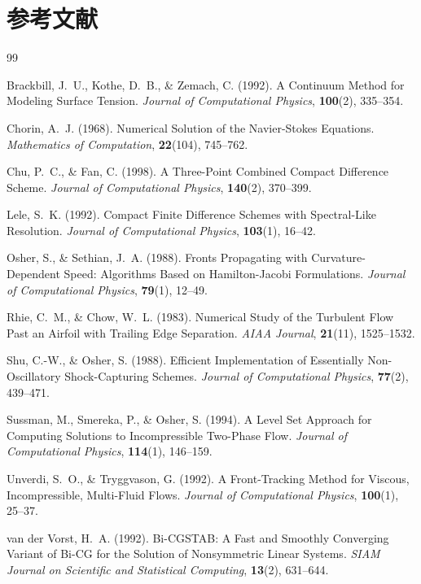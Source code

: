 \documentclass[12pt, a4paper, titlepage]{article}
\newcommand{\jp}[1]{{\normalfont\jpfont #1}}
\begin{document}
\section*{\jp{参考文献}}
\addcontentsline{toc}{section}{\jp{参考文献}}

\begin{thebibliography}{99}

Brackbill, J.~U., Kothe, D.~B., \& Zemach, C. (1992).
A Continuum Method for Modeling Surface Tension.
\textit{Journal of Computational Physics}, \textbf{100}(2), 335--354.

Chorin, A.~J. (1968).
Numerical Solution of the Navier-Stokes Equations.
\textit{Mathematics of Computation}, \textbf{22}(104), 745--762.

Chu, P.~C., \& Fan, C. (1998).
A Three-Point Combined Compact Difference Scheme.
\textit{Journal of Computational Physics}, \textbf{140}(2), 370--399.

Lele, S.~K. (1992).
Compact Finite Difference Schemes with Spectral-Like Resolution.
\textit{Journal of Computational Physics}, \textbf{103}(1), 16--42.

Osher, S., \& Sethian, J.~A. (1988).
Fronts Propagating with Curvature-Dependent Speed:
Algorithms Based on Hamilton-Jacobi Formulations.
\textit{Journal of Computational Physics}, \textbf{79}(1), 12--49.

Rhie, C.~M., \& Chow, W.~L. (1983).
Numerical Study of the Turbulent Flow Past an Airfoil with Trailing Edge Separation.
\textit{AIAA Journal}, \textbf{21}(11), 1525--1532.

Shu, C.-W., \& Osher, S. (1988).
Efficient Implementation of Essentially Non-Oscillatory Shock-Capturing Schemes.
\textit{Journal of Computational Physics}, \textbf{77}(2), 439--471.

Sussman, M., Smereka, P., \& Osher, S. (1994).
A Level Set Approach for Computing Solutions to Incompressible Two-Phase Flow.
\textit{Journal of Computational Physics}, \textbf{114}(1), 146--159.

Unverdi, S.~O., \& Tryggvason, G. (1992).
A Front-Tracking Method for Viscous, Incompressible, Multi-Fluid Flows.
\textit{Journal of Computational Physics}, \textbf{100}(1), 25--37.

van der Vorst, H.~A. (1992).
Bi-CGSTAB: A Fast and Smoothly Converging Variant of Bi-CG for the Solution of
Nonsymmetric Linear Systems.
\textit{SIAM Journal on Scientific and Statistical Computing}, \textbf{13}(2), 631--644.

\end{thebibliography}
\end{document}

